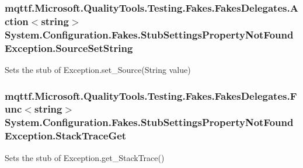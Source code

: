 \hypertarget{class_system_1_1_configuration_1_1_fakes_1_1_stub_settings_property_not_found_exception_a81c6361a9709f46b2c1044aef4248b7b}{
\subsubsection[{Source\-Set\-String}]{\setlength{\rightskip}{0pt plus 5cm}mqttf.\-Microsoft.\-Quality\-Tools.\-Testing.\-Fakes.\-Fakes\-Delegates.\-Action$<$string$>$ System.\-Configuration.\-Fakes.\-Stub\-Settings\-Property\-Not\-Found\-Exception.\-Source\-Set\-String}}\label{class_system_1_1_configuration_1_1_fakes_1_1_stub_settings_property_not_found_exception_a81c6361a9709f46b2c1044aef4248b7b}


Sets the stub of Exception.\-set\-\_\-\-Source(\-String value)

\hypertarget{class_system_1_1_configuration_1_1_fakes_1_1_stub_settings_property_not_found_exception_a033b12945084ee673794449ae69ba07c}{
\subsubsection[{Stack\-Trace\-Get}]{\setlength{\rightskip}{0pt plus 5cm}mqttf.\-Microsoft.\-Quality\-Tools.\-Testing.\-Fakes.\-Fakes\-Delegates.\-Func$<$string$>$ System.\-Configuration.\-Fakes.\-Stub\-Settings\-Property\-Not\-Found\-Exception.\-Stack\-Trace\-Get}}\label{class_system_1_1_configuration_1_1_fakes_1_1_stub_settings_property_not_found_exception_a033b12945084ee673794449ae69ba07c}


Sets the stub of Exception.\-get\-\_\-\-Stack\-Trace()

